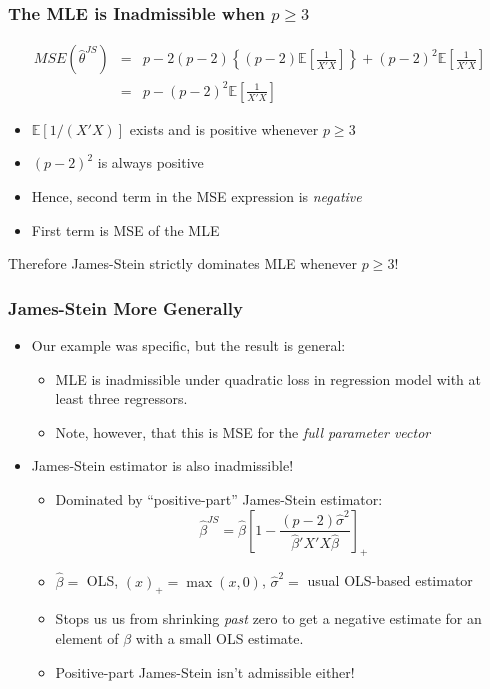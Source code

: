 \begin{frame}
  \frametitle{The MLE is Inadmissible when $p\geq 3$}
  \small
\begin{eqnarray*}
  MSE\left( \hat{\theta}^{JS} \right) &=& p - 2(p-2)\left\{ \left( p-2 \right) \mathbb{E}\left[ \frac{1}{X'X} \right] \right\} + \left( p-2 \right)^{2}\mathbb{E}\left[ \frac{1}{X'X} \right]\\
  &=& p - \left( p-2 \right)^2 \mathbb{E}\left[ \frac{1}{X'X} \right]
\end{eqnarray*}

\vspace{-1em}
\begin{itemize}
  \item $\mathbb{E}[1/(X'X)]$ exists and is positive whenever $p \geq 3$
  \item $(p-2)^2$ is always positive
  \item Hence, second term in the MSE expression is \emph{negative}
  \item First term is MSE of the MLE 
\end{itemize}


\alert{Therefore James-Stein strictly dominates MLE whenever $p\geq 3$!}
\end{frame}
\begin{frame}
  \frametitle{James-Stein More Generally}
  \begin{itemize}
    \item Our example was specific, but the result is general:
      \begin{itemize}
        \item MLE is inadmissible under quadratic loss in regression model with at least three regressors.
        \item Note, however, that this is MSE for the \emph{full parameter vector}
      \end{itemize}
    \item James-Stein estimator is also inadmissible!
      \begin{itemize}
        \item Dominated by ``positive-part'' James-Stein estimator:
$$\widehat{\beta}^{JS} = \widehat{\beta}\left[1 -\frac{(p-2)\widehat{\sigma}^2}{\widehat{\beta}'X'X \widehat{\beta}} \right]_+$$
\item $\widehat{\beta} = $ OLS, $(x)_+ = \max(x,0)$, $\widehat{\sigma}^2 =$ usual OLS-based estimator
\item Stops us us from shrinking \emph{past} zero to get a negative estimate for an element of $\beta$ with a small OLS estimate.
\item Positive-part James-Stein isn't admissible either!
      \end{itemize}
  \end{itemize}
  
\end{frame}
